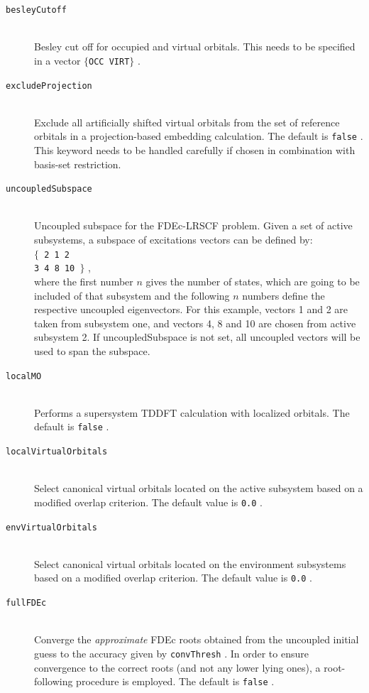 \documentclass[bibliography=totocnumbered,a4paper,10pt,oneside]{scrbook}
\newcommand{\ttt}[1]{%
  \begingroup\setlength{\fboxsep}{1pt}%
  \colorbox{serenity-green!30}{\texttt{\hspace*{2pt}\vphantom{(g}#1\hspace*{2pt}}}%
  \endgroup
}
\begin{document}
\begin{description}
    \item [\texttt{besleyCutoff}]\hfill \\
    Besley cut off for occupied and virtual orbitals. This needs to be specified in a vector \ttt{$\{$OCC VIRT$\}$}.
    \item [\texttt{excludeProjection}]\hfill \\
    Exclude all artificially shifted virtual orbitals from the set of reference orbitals in a projection-based embedding calculation. The default is \ttt{false}. This keyword needs to be handled carefully if chosen in combination with basis-set restriction.
    \item [\texttt{uncoupledSubspace}]\hfill \\
    Uncoupled subspace for the FDEc-LRSCF problem. Given a set of active subsystems, a subspace of excitations vectors can be defined by: \\  \ttt{$\{$ 2 1 2} \\
    \ttt{3 4 8 10 $\}$}, \\ where the first number $n$ gives the number of states, which are going to be included of that subsystem and the following $n$ numbers define the respective uncoupled eigenvectors. For this example, vectors 1 and 2 are taken from subsystem one, and vectors 4, 8 and 10 are chosen from active subsystem 2. If uncoupledSubspace is not set, all uncoupled vectors will be used to span the subspace.
    \item [\texttt{localMO}]\hfill \\
    Performs a supersystem TDDFT calculation with localized orbitals. The default is \ttt{false}.
    \item [\texttt{localVirtualOrbitals}]\hfill \\
    Select canonical virtual orbitals located on the active subsystem based on a modified overlap criterion. The default value is \ttt{0.0}.
    \item [\texttt{envVirtualOrbitals}]\hfill \\
    Select canonical virtual orbitals located on the environment subsystems based on a modified overlap criterion. The default value is \ttt{0.0}.
    \item [\texttt{fullFDEc}]\hfill \\
    Converge the \emph{approximate} FDEc roots obtained from the uncoupled initial guess to the accuracy given by \ttt{convThresh}. In order to ensure convergence to the correct roots (and not any lower lying ones), a root-following procedure is employed. The default is \ttt{false}.

\end{description}
\end{document}
